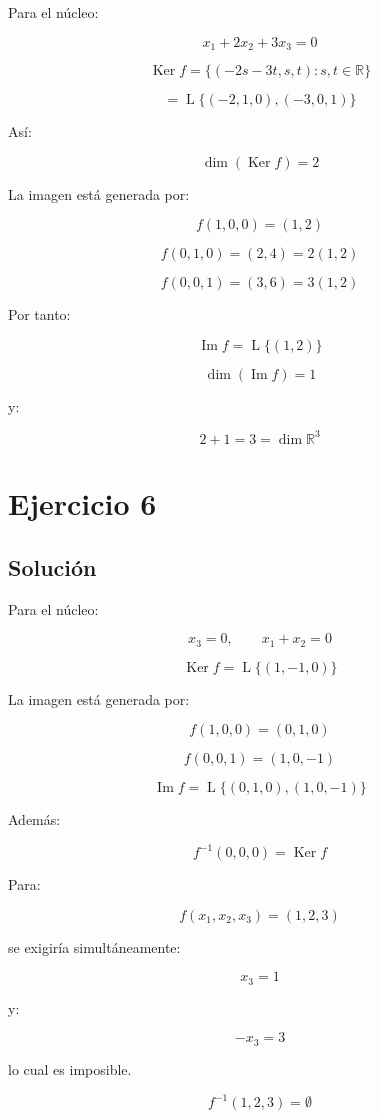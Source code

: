 \documentclass[11pt,a4paper]{article}
\newcommand{\R}{\mathbb{R}}
\newcommand{\Ker}{\operatorname{Ker}}
\newcommand{\Ima}{\operatorname{Im}}
\newcommand{\Span}{\operatorname{L}}
\begin{document}
	Para el núcleo:

	\[
	x_1+2x_2+3x_3=0
	\]

	\[
	\boxed{
	\Ker f
	=
	\{(-2s-3t,s,t):s,t\in\R\}
	}
	\]

	\[
	=
	\Span\{(-2,1,0),(-3,0,1)\}
	\]

	Así:

	\[
	\boxed{
	\dim(\Ker f)=2
	}
	\]

	La imagen está generada por:

	\[
	f(1,0,0)=(1,2)
	\]

	\[
	f(0,1,0)=(2,4)=2(1,2)
	\]

	\[
	f(0,0,1)=(3,6)=3(1,2)
	\]

	Por tanto:

	\[
	\boxed{
	\Ima f=\Span\{(1,2)\}
	}
	\]

	\[
	\boxed{
	\dim(\Ima f)=1
	}
	\]

	y:

	\[
	2+1=3=\dim\R^3
	\]

\section{Ejercicio 6}
	\subsection{Solución}

	Para el núcleo:

	\[
	x_3=0,
	\qquad
	x_1+x_2=0
	\]

	\[
	\boxed{
	\Ker f
	=
	\Span\{(1,-1,0)\}
	}
	\]

	La imagen está generada por:

	\[
	f(1,0,0)=(0,1,0)
	\]

	\[
	f(0,0,1)=(1,0,-1)
	\]

	\[
	\boxed{
	\Ima f
	=
	\Span\{(0,1,0),(1,0,-1)\}
	}
	\]

	Además:

	\[
	\boxed{
	f^{-1}(0,0,0)
	=
	\Ker f
	}
	\]

	Para:

	\[
	f(x_1,x_2,x_3)=(1,2,3)
	\]

	se exigiría simultáneamente:

	\[
	x_3=1
	\]

	y:

	\[
	-x_3=3
	\]

	lo cual es imposible.

	\[
	\boxed{
	f^{-1}(1,2,3)=\emptyset
	}
	\]
\end{document}
